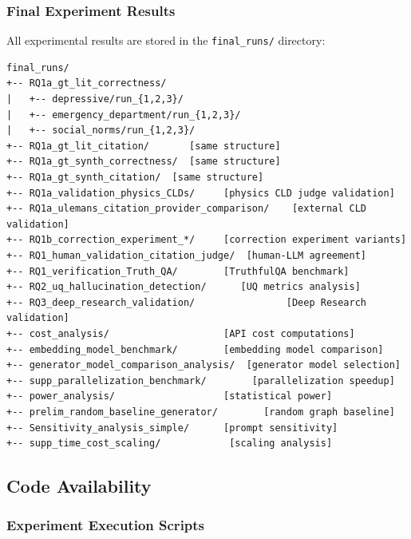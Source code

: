 \subsubsection{Final Experiment Results}

All experimental results are stored in the \texttt{final\_runs/} directory:

\begin{verbatim}
final_runs/
+-- RQ1a_gt_lit_correctness/
|   +-- depressive/run_{1,2,3}/
|   +-- emergency_department/run_{1,2,3}/
|   +-- social_norms/run_{1,2,3}/
+-- RQ1a_gt_lit_citation/       [same structure]
+-- RQ1a_gt_synth_correctness/  [same structure]
+-- RQ1a_gt_synth_citation/  [same structure]
+-- RQ1a_validation_physics_CLDs/     [physics CLD judge validation]
+-- RQ1a_ulemans_citation_provider_comparison/    [external CLD validation]
+-- RQ1b_correction_experiment_*/     [correction experiment variants]
+-- RQ1_human_validation_citation_judge/  [human-LLM agreement]
+-- RQ1_verification_Truth_QA/        [TruthfulQA benchmark]
+-- RQ2_uq_hallucination_detection/      [UQ metrics analysis]
+-- RQ3_deep_research_validation/                [Deep Research validation]
+-- cost_analysis/                    [API cost computations]
+-- embedding_model_benchmark/        [embedding model comparison]
+-- generator_model_comparison_analysis/  [generator model selection]
+-- supp_parallelization_benchmark/        [parallelization speedup]
+-- power_analysis/                   [statistical power]
+-- prelim_random_baseline_generator/        [random graph baseline]
+-- Sensitivity_analysis_simple/      [prompt sensitivity]
+-- supp_time_cost_scaling/            [scaling analysis]
\end{verbatim}

\subsection{Code Availability}
\label{sec:code_availability}

\subsubsection{Experiment Execution Scripts}

